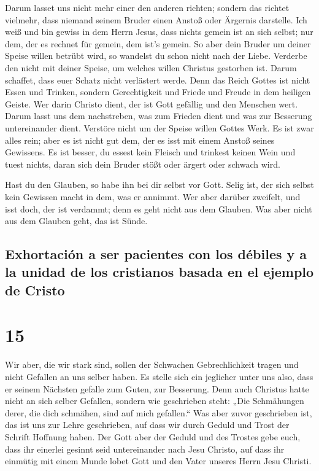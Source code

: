  Darum lasset uns nicht mehr einer den anderen richten;
sondern das richtet vielmehr, dass niemand seinem Bruder einen Anstoß
oder Ärgernis darstelle.  Ich weiß und bin gewiss in dem
Herrn Jesus, dass nichts gemein ist an sich selbst; nur dem, der es
rechnet für gemein, dem ist's gemein.  So aber dein
Bruder um deiner Speise willen betrübt wird, so wandelst du schon nicht
nach der Liebe. Verderbe den nicht mit deiner Speise, um welches willen
Christus gestorben ist.  Darum schaffet, dass euer Schatz
nicht verlästert werde.  Denn das Reich Gottes ist nicht
Essen und Trinken, sondern Gerechtigkeit und Friede und Freude in dem
heiligen Geiste.  Wer darin Christo dient, der ist Gott
gefällig und den Menschen wert.  Darum lasst uns dem
nachstreben, was zum Frieden dient und was zur Besserung untereinander
dient.  Verstöre nicht um der Speise willen Gottes Werk.
Es ist zwar alles rein; aber es ist nicht gut dem, der es isst mit einem
Anstoß seines Gewissens.  Es ist besser, du essest kein
Fleisch und trinkest keinen Wein und tuest nichts, daran sich dein
Bruder stößt oder ärgert oder schwach wird.

 Hast du den Glauben, so habe ihn bei dir selbst vor
Gott. Selig ist, der sich selbst kein Gewissen macht in dem, was er
annimmt.  Wer aber darüber zweifelt, und isst doch, der
ist verdammt; denn es geht nicht aus dem Glauben. Was aber nicht aus dem
Glauben geht, das ist Sünde.

\hypertarget{exhortaciuxf3n-a-ser-pacientes-con-los-duxe9biles-y-a-la-unidad-de-los-cristianos-basada-en-el-ejemplo-de-cristo}{%
\subsection{Exhortación a ser pacientes con los débiles y a la unidad de
los cristianos basada en el ejemplo de
Cristo}\label{exhortaciuxf3n-a-ser-pacientes-con-los-duxe9biles-y-a-la-unidad-de-los-cristianos-basada-en-el-ejemplo-de-cristo}}

\hypertarget{section-14}{%
\section{15}\label{section-14}}

 Wir aber, die wir stark sind, sollen der Schwachen
Gebrechlichkeit tragen und nicht Gefallen an uns selber haben.
 Es stelle sich ein jeglicher unter uns also, dass er
seinem Nächsten gefalle zum Guten, zur Besserung.  Denn
auch Christus hatte nicht an sich selber Gefallen, sondern wie
geschrieben steht: „Die Schmähungen derer, die dich schmähen, sind auf
mich gefallen.``  Was aber zuvor geschrieben ist, das ist
uns zur Lehre geschrieben, auf dass wir durch Geduld und Trost der
Schrift Hoffnung haben.  Der Gott aber der Geduld und des
Trostes gebe euch, dass ihr einerlei gesinnt seid untereinander nach
Jesu Christo,  auf dass ihr einmütig mit einem Munde lobet
Gott und den Vater unseres Herrn Jesu Christi.

